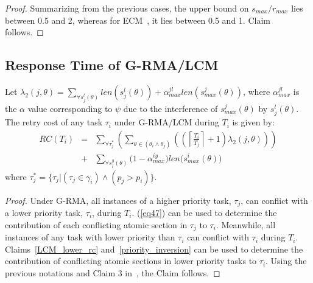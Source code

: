 \begin{proof}
Summarizing from the previous cases, the upper bound on $s_{max}/r_{max}$
lies between 0.5 and 2, whereas for ECM~\cite{stmconcurrencycontrol:emsoft11},
it lies between 0.5 and 1. Claim follows.

\end{proof}

\subsection{Response Time of G-RMA/LCM}
\label{rma}

\begin{clm}\label{response g-rma/lcm}
Let $\lambda_{2}(j,\theta)=\sum_{\forall s_{j}^{l}(\theta)}len(s_{j}^{l}(\theta))+\alpha_{max}^{jl}len(s_{max}^{j}(\theta))$, where $\alpha_{max}^{jl}$ is the $\alpha$ value corresponding to $\psi$ due to the interference of $s_{max}^j(\theta)$ by $s_j^l(\theta)$. The retry cost of any task $\tau_i$ under G-RMA/LCM during $T_i$ 
is given by:
\begin{eqnarray}
RC\left(T_i\right) & = &
  \sum_{\forall \tau_{j}^{*}}\left(\sum_{\theta\in(\theta_{i}\wedge\theta_{j})}\left(\left(\left\lceil\frac{T_i}{T_{j}}\right\rceil +1\right)\lambda_{2}(j,\theta)\right)\right)\nonumber\\
& + & \sum_{\forall s_{i}^{y}(\theta)}\Big(1-\alpha_{max}^{iy}\Big)len\Big(s_{max}^i(\theta)\Big)
\label{eq60}
\end{eqnarray}
where $\tau_{j}^{*}=\{\tau_{j}|(\tau_{j}\in\gamma_{i})\wedge(p_{j}>p_{i})\}$.
\end{clm}

\begin{proof}
Under G-RMA, all instances of a higher priority task, $\tau_{j}$, can conflict with a lower priority task,
$\tau_{i}$, during $T_{i}$. (\ref{eq47}) can be used to determine the contribution of each conflicting atomic section in $\tau_j$ to $\tau_i$. Meanwhile, all instances of any task with lower priority than $\tau_{i}$ can conflict with $\tau_i$ during $T_{i}$. Claims~\ref{LCM_lower_rc} and~\ref{priority_inversion} can be used to determine the contribution of conflicting atomic sections in lower priority tasks to $\tau_i$.
%
Using the previous notations and Claim 3 in~\cite{stmconcurrencycontrol:emsoft11}, the Claim follows.
\end{proof}

